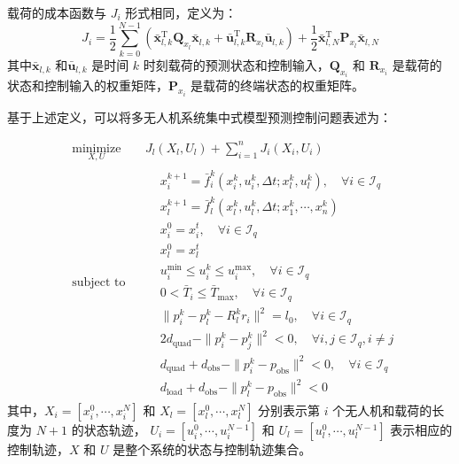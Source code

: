 \documentclass[lang=chs, degree=master, blindreview=false, winfonts=true]{yanputhesis}
\begin{document}
载荷的成本函数与 \( J_i \) 形式相同，定义为：
\begin{equation}
    J_i = \frac{1}{2}\sum_{k=0}^{N-1}\left(\bar{\boldsymbol{x}}_{l,k}^\mathrm{T}\boldsymbol{Q}_{x_l}\bar{\boldsymbol{x}}_{l,k}+\bar{\boldsymbol{u}}_{l,k}^\mathrm{T}\boldsymbol{R}_{x_l}\bar{\boldsymbol{u}}_{l,k}\right)+\frac{1}{2}\bar{\boldsymbol{x}}_{l,N}^\mathrm{T}\boldsymbol{P}_{x_l}\bar{\boldsymbol{x}}_{l,N}
	\label{jpayload}
\end{equation}
其中$\bar{\boldsymbol{x}}_{l,k}$ 和$\bar{\boldsymbol{u}}_{l,k}$ 是时间 $k$ 时刻载荷的预测状态和控制输入，$\boldsymbol{Q}_{x_i}$ 和 $\boldsymbol{R}_{x_i}$ 是载荷的状态和控制输入的权重矩阵，$\boldsymbol{P}_{x_i}$ 是载荷的终端状态的权重矩阵。


基于上述定义，可以将多无人机系统集中式模型预测控制问题表述为：

\begin{equation}
	\begin{aligned} 
	&\operatorname*{minimize}_{X,U}& & J_l(X_l, U_l) + \sum_{i=1}^n J_i(X_i, U_i)  \\
	&\text{subject to}& & \begin{aligned}
& x_i^{k+1} = \bar{f}_i^k(x_i^k, u_i^k, \Delta t; x_l^k, u_l^k), \quad \forall i \in \mathcal{I}_q \\
& x_l^{k+1} = \bar{f}_l^k(x_l^k, u_l^k, \Delta t; x_1^k, \cdots, x_n^k) \\
& x_i^0 = x_i^t, \quad \forall i \in \mathcal{I}_q \\
& x_l^0 = x_l^t \\
& u_i^{\min} \leq u_i^k \leq u_i^{\max}, \quad \forall i \in \mathcal{I}_q \\
& 0 < \bar{T}_i \leq \bar{T}_{\max}, \quad \forall i \in \mathcal{I}_q \\
& \|p_i^k - p_l^k - R_l^k r_i\|^2 = l_0, \quad \forall i \in \mathcal{I}_q \\
& 2d_\text{quad} - \|p_i^k - p_j^k\|^2 < 0, \quad \forall i, j \in \mathcal{I}_q, i \neq j \\
& d_\text{quad} + d_\text{obs} - \|p_i^k - p_\text{obs}\|^2 < 0, \quad \forall i \in \mathcal{I}_q \\
& d_\text{load} + d_\text{obs} - \|p_l^k - p_\text{obs}\|^2 < 0        
	\end{aligned}	
\end{aligned}
\label{multimpc}
\end{equation}
其中，\( X_i = \left[ x_i^0, \cdots, x_i^N \right] \) 和 \( X_l = \left[ x_l^0, \cdots, x_l^N \right] \) 分别表示第 \( i \) 个无人机和载荷的长度为 \( N+1 \) 的状态轨迹，
\( U_i = \left[ u_i^0, \cdots, u_i^{N-1} \right] \) 和 \( U_l = \left[ u_l^0, \cdots, u_l^{N-1} \right] \) 表示相应的控制轨迹，\( X \) 和 \( U \) 是整个系统的状态与控制轨迹集合。
\end{document}
